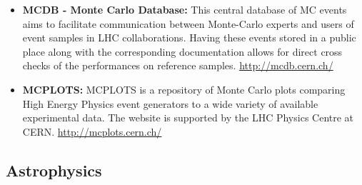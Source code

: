 \begin{itemize}
\item
  \textbf{MCDB - Monte Carlo Database:} This central database of MC
  events aims to facilitate communication between Monte-Carlo experts
  and users of event samples in LHC collaborations. Having these events
  stored in a public place along with the corresponding documentation
  allows for direct cross checks of the performances on reference
  samples. \url{http://mcdb.cern.ch/}
\item
  \textbf{MCPLOTS:} MCPLOTS is a repository of Monte Carlo plots
  comparing High Energy Physics event generators to a wide variety of
  available experimental data. The website is supported by the LHC
  Physics Centre at CERN. \url{http://mcplots.cern.ch/}
\end{itemize}

\subsection{Astrophysics}\label{databases:subsec:astrophysrep}

